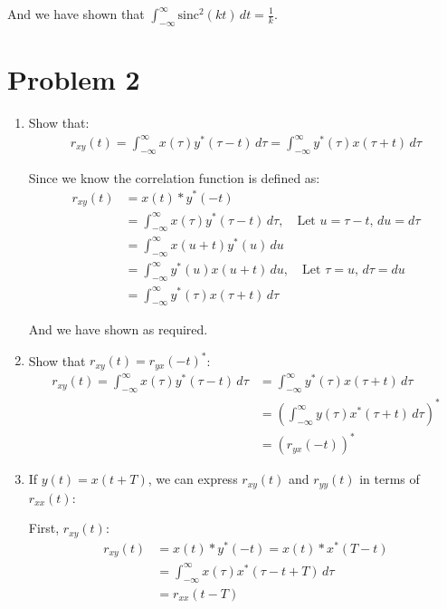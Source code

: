 \documentclass{article}
\begin{document}
\begin{enumerate}[label=1.\arabic*]
    And we have shown that $\int_{-\infty}^{\infty} \text{sinc}^2(kt) \, dt = \frac{1}{k}$.
\end{enumerate}

\section{Problem 2}
\begin{enumerate}[label=2.\arabic*]
    \item Show that:
    \begin{align*}
        r_{xy}(t) = \int_{-\infty}^{\infty} x(\tau)y^*(\tau - t) \, d\tau = \int_{-\infty}^{\infty} y^*(\tau)x(\tau + t) \, d\tau
    \end{align*}

    Since we know the correlation function is defined as:
    \begin{align*}
        r_{xy}(t) &= x(t) \ast y^*(-t) \\
        &= \int_{-\infty}^{\infty} x(\tau)y^*(\tau - t) \, d\tau, \quad \text{Let } u = \tau - t, \, du = d\tau \\ 
        &= \int_{-\infty}^{\infty} x(u + t)y^*(u) \, du \\
        &= \int_{-\infty}^{\infty} y^*(u)x(u + t) \, du, \quad \text{Let } \tau = u, \, d\tau = du \\
        &= \int_{-\infty}^{\infty} y^*(\tau)x(\tau + t) \, d\tau
    \end{align*}

    And we have shown as required.

    \item Show that $r_{xy}(t) = r_{yx}(-t)^\ast$:
    \begin{align*}
        r_{xy}(t) = \int_{-\infty}^{\infty} x(\tau)y^*(\tau - t) \, d\tau &= \int_{-\infty}^{\infty} y^*(\tau)x(\tau + t) \, d\tau \\
        &= \left(\int_{-\infty}^{\infty} y(\tau)x^*(\tau + t) \, d\tau\right)^\ast \\
        &= \left(r_{yx}(-t)\right)^\ast
    \end{align*}

    \item If $y(t) = x(t+T)$, we can express $r_{xy}(t)$ and $r_{yy}(t)$ in terms of $r_{xx}(t)$:
    
    First, $r_{xy}(t)$:
    \begin{align*}
        r_{xy}(t) &= x(t) \ast y^*(-t) = x(t) \ast x^*(T - t) \\
        &= \int_{-\infty}^{\infty} x(\tau)x^*(\tau - t + T) \, d\tau \\
        &= r_{xx}(t - T)
    \end{align*}


\end{enumerate}
\end{document}
